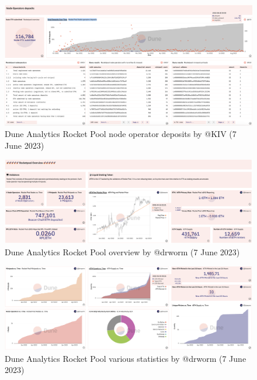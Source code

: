 \documentclass[UTF8]{article}
\begin{document}
{\begin{figure}[htbp]
\begin{center}
\includegraphics[width=\linewidth]{images/dunerocket3}
\caption{Dune Analytics Rocket Pool node operator deposits by @KIV  (7 June 2023)}
\label{fig:dunerocket3}
\end{center}
\end{figure}

\begin{figure}[htbp]
\begin{center}
\includegraphics[width=\linewidth]{images/rocketdrworm1}
\caption{Dune Analytics Rocket Pool overview by @drworm  (7 June 2023)}
\label{fig:rocketdrworm1}
\end{center}
\end{figure}

\begin{figure}[htbp]
\begin{center}
\includegraphics[width=\linewidth]{images/rocketdrworm2}
\caption{Dune Analytics Rocket Pool various statistics by @drworm  (7 June 2023)}
\label{fig:rocketdrworm2}
\end{center}
\end{figure}

}
\end{document}

